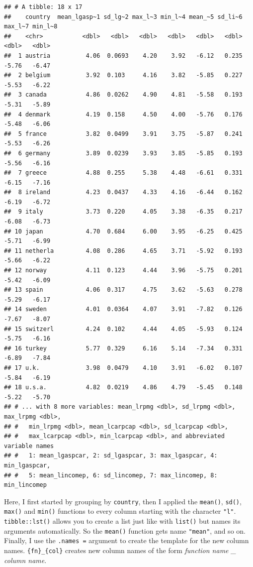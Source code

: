 \documentclass[
]{article}
\begin{document}
\begin{verbatim}
## # A tibble: 18 x 17
##    country  mean_lgasp~1 sd_lg~2 max_l~3 min_l~4 mean_~5 sd_li~6 max_l~7 min_l~8
##    <chr>           <dbl>   <dbl>   <dbl>   <dbl>   <dbl>   <dbl>   <dbl>   <dbl>
##  1 austria          4.06  0.0693    4.20    3.92   -6.12   0.235   -5.76   -6.47
##  2 belgium          3.92  0.103     4.16    3.82   -5.85   0.227   -5.53   -6.22
##  3 canada           4.86  0.0262    4.90    4.81   -5.58   0.193   -5.31   -5.89
##  4 denmark          4.19  0.158     4.50    4.00   -5.76   0.176   -5.48   -6.06
##  5 france           3.82  0.0499    3.91    3.75   -5.87   0.241   -5.53   -6.26
##  6 germany          3.89  0.0239    3.93    3.85   -5.85   0.193   -5.56   -6.16
##  7 greece           4.88  0.255     5.38    4.48   -6.61   0.331   -6.15   -7.16
##  8 ireland          4.23  0.0437    4.33    4.16   -6.44   0.162   -6.19   -6.72
##  9 italy            3.73  0.220     4.05    3.38   -6.35   0.217   -6.08   -6.73
## 10 japan            4.70  0.684     6.00    3.95   -6.25   0.425   -5.71   -6.99
## 11 netherla         4.08  0.286     4.65    3.71   -5.92   0.193   -5.66   -6.22
## 12 norway           4.11  0.123     4.44    3.96   -5.75   0.201   -5.42   -6.09
## 13 spain            4.06  0.317     4.75    3.62   -5.63   0.278   -5.29   -6.17
## 14 sweden           4.01  0.0364    4.07    3.91   -7.82   0.126   -7.67   -8.07
## 15 switzerl         4.24  0.102     4.44    4.05   -5.93   0.124   -5.75   -6.16
## 16 turkey           5.77  0.329     6.16    5.14   -7.34   0.331   -6.89   -7.84
## 17 u.k.             3.98  0.0479    4.10    3.91   -6.02   0.107   -5.84   -6.19
## 18 u.s.a.           4.82  0.0219    4.86    4.79   -5.45   0.148   -5.22   -5.70
## # ... with 8 more variables: mean_lrpmg <dbl>, sd_lrpmg <dbl>, max_lrpmg <dbl>,
## #   min_lrpmg <dbl>, mean_lcarpcap <dbl>, sd_lcarpcap <dbl>,
## #   max_lcarpcap <dbl>, min_lcarpcap <dbl>, and abbreviated variable names
## #   1: mean_lgaspcar, 2: sd_lgaspcar, 3: max_lgaspcar, 4: min_lgaspcar,
## #   5: mean_lincomep, 6: sd_lincomep, 7: max_lincomep, 8: min_lincomep
\end{verbatim}

Here, I first started by grouping by \texttt{country}, then I applied the \texttt{mean()}, \texttt{sd()}, \texttt{max()} and
\texttt{min()} functions to every column starting with the character \texttt{"l"}. \texttt{tibble::lst()} allows you to
create a list just like with \texttt{list()} but names its arguments automatically. So the \texttt{mean()} function
gets name \texttt{"mean"}, and so on. Finally, I use the \texttt{.names\ =} argument to create the template for
the new column names. \texttt{\{fn\}\_\{col\}} creates new column names of the form \emph{function name \_ column name}.
\end{document}
